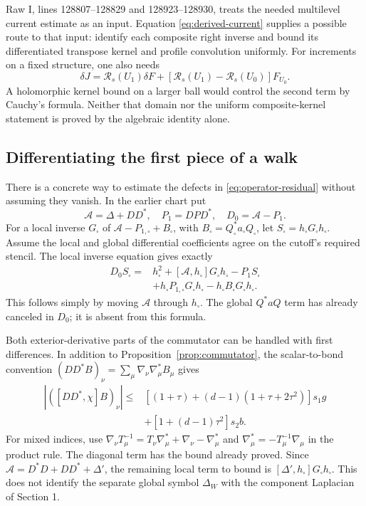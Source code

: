 \documentclass[11pt]{article}
\theoremstyle{remark}
\begin{document}
Raw I, lines 128807--128829 and 128923--128930, treats the needed
multilevel current estimate as an input. Equation
\eqref{eq:derived-current} supplies a possible route to that input:
identify each composite right inverse and bound its differentiated
transpose kernel and profile convolution uniformly. For increments
on a fixed structure, one also needs
\[
 \delta J=\mathcal R_s(U_1)\delta F+
          [\mathcal R_s(U_1)-\mathcal R_s(U_0)]F_{U_0}.
\]
A holomorphic kernel bound on a larger ball would control the second
term by Cauchy's formula. Neither that domain nor the uniform
composite-kernel statement is proved by the algebraic identity alone.

\subsection{Differentiating the first piece of a walk}

There is a concrete way to estimate the defects in
\eqref{eq:operator-residual} without assuming they vanish. In the
earlier chart put
\[
 \mathcal A=\Delta+DD^*,\quad P_1=DPD^*,\quad
 D_0=\mathcal A-P_1.
\]
For a local inverse $G_\square$ of
$\mathcal A-P_{1,\square}+B_\square$, with
$B_\square=Q_\square^*a_\square Q_\square$, let
$S_\square=h_\square G_\square h_\square$.
Assume the local and global differential coefficients agree on the
cutoff's required stencil. The local inverse equation gives exactly
\begin{align}\label{eq:head}
 D_0S_\square={}&h_\square^2
 +[\mathcal A,h_\square]G_\square h_\square
 -P_1S_\square\nonumber\\
 &+h_\square P_{1,\square}G_\square h_\square
 -h_\square B_\square G_\square h_\square.
\end{align}
This follows simply by moving $\mathcal A$ through $h_\square$.
The global $Q^*aQ$ term has already canceled in $D_0$; it is absent
from this formula.

Both exterior-derivative parts of the commutator can be handled with
first differences. In addition to Proposition~\ref{prop:commutator},
the scalar-to-bond convention $(DD^*B)_\nu=
\sum_\mu\nabla_\nu\nabla_\mu^*B_\mu$ gives
\begin{align*}
 |([DD^*,\chi]B)_\nu|
 \le{}&[(1+\tau)+(d-1)(1+\tau+2\tau^2)]s_1g\\
 &+[1+(d-1)\tau^2]s_2b.
\end{align*}
For mixed indices, use
$\nabla_\nu T_\mu^{-1}=T_\nu\nabla_\mu^*
 +\nabla_\nu-\nabla_\mu^*$ and
$\nabla_\mu^*=-T_\mu^{-1}\nabla_\mu$ in the product rule.
The diagonal term has the bound already proved. Since
$\mathcal A=D^*D+DD^*+\Delta'$, the remaining local term to bound
is $[\Delta',h_\square]G_\square h_\square$.
This does not identify the separate global symbol $\Delta_W$ with
the component Laplacian of Section 1.
\end{document}
